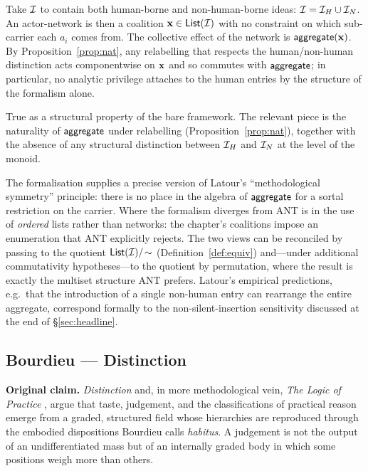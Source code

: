 \formalclaim
Take $\mathcal{I}$ to contain both human-borne and non-human-borne ideas:
$\mathcal{I} = \mathcal{I}_H \cup \mathcal{I}_N$. An actor-network is then a
coalition $\mathbf{x} \in \mathsf{List}(\mathcal{I})$ with no constraint on which
sub-carrier each $a_i$ comes from. The collective effect of the
network is $\mathsf{aggregate}(\mathbf{x})$. By Proposition~\ref{prop:nat}, any
relabelling that respects the human/non-human distinction acts
componentwise on $\mathbf{x}$ and so commutes with $\mathsf{aggregate}$; in
particular, no analytic privilege attaches to the human entries by
the structure of the formalism alone.

\formalstatus
True as a structural property of the bare framework. The relevant
piece is the naturality of $\mathsf{aggregate}$ under relabelling
(Proposition~\ref{prop:nat}), together with the absence of any
structural distinction between $\mathcal{I}_H$ and $\mathcal{I}_N$ at the
level of the monoid.

\litcomment
The formalisation supplies a precise version of Latour's
``methodological symmetry'' principle: there is no place in the
algebra of $\mathsf{aggregate}$ for a sortal restriction on the carrier.
Where the formalism diverges from ANT is in the use of \emph{ordered}
lists rather than networks: the chapter's coalitions impose an
enumeration that ANT explicitly rejects. The two views can be
reconciled by passing to the quotient $\mathsf{List}(\mathcal{I})/\!\sim$
(Definition~\ref{def:equiv}) and---under additional commutativity
hypotheses---to the quotient by permutation, where the result is
exactly the multiset structure ANT prefers. Latour's empirical
predictions, e.g.~that the introduction of a single non-human entry
can rearrange the entire aggregate, correspond formally to the
non-silent-insertion sensitivity discussed at the end of
\S\ref{sec:headline}.

\subsection*{Bourdieu --- Distinction}

\begin{zooentry*}\end{zooentry*}

\textbf{Original claim.} \emph{Distinction} \cite{Bourdieu1984} and,
in more methodological vein, \emph{The Logic of Practice}
\cite{BourdieuLogic1990}, argue that taste, judgement, and the
classifications of practical reason emerge from a graded, structured
field whose hierarchies are reproduced through the embodied
dispositions Bourdieu calls \emph{habitus}. A judgement is not the
output of an undifferentiated mass but of an internally graded body
in which some positions weigh more than others.

